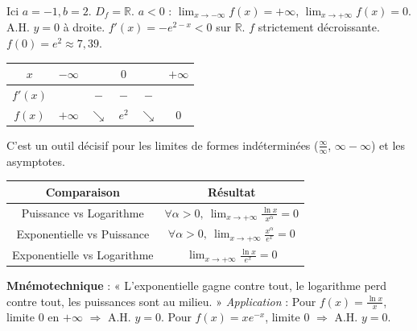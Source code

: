 \documentclass[11pt]{article}
\newcommand{\legende}[1]{\par\vspace{6pt}{\popsemi\fontsize{9}{11.5}\selectfont\color{popmuted}#1}}
\begin{document}
\begin{exemplebox}[Étude de $f(x) = e^{2-x} = e^{-x+2}$]
Ici $a=-1, b=2$.
$D_f = \mathbb{R}$.
$a<0$ : $\lim_{x\to -\infty} f(x) = +\infty$, $\lim_{x\to +\infty} f(x) = 0$. A.H. $y=0$ à droite.
$f'(x) = -e^{2-x} < 0$ sur $\mathbb{R}$. $f$ strictement décroissante.
$f(0) = e^2 \approx 7,39$.
\begin{center}
\begin{tabular}{|c|ccccc|}\hline
$x$ & $-\infty$ & & $0$ & & $+\infty$ \\ \hline
$f'(x)$ & & $-$ & $-$ & $-$ & \\ \hline
$f(x)$ & $+\infty$ & $\searrow$ & $e^2$ & $\searrow$ & $0$ \\ \hline
\end{tabular}
\end{center}
\tcblower
\begin{popfigure}
\legende{Courbe de $f(x)=e^{2-x}$.}
\end{popfigure}
\end{exemplebox}

\begin{savaistu}
C'est un outil décisif pour les limites de formes indéterminées ($\frac{\infty}{\infty}$, $\infty-\infty$) et les asymptotes.
\begin{center}
\begin{tabular}{|c|c|}\hline
\rowcolor{popblueL} \textbf{Comparaison} & \textbf{Résultat} \\ \hline
Puissance vs Logarithme & $\forall \alpha > 0,\ \lim_{x\to+\infty} \frac{\ln x}{x^\alpha} = 0$ \\ \hline
Exponentielle vs Puissance & $\forall \alpha > 0,\ \lim_{x\to+\infty} \frac{x^\alpha}{e^x} = 0$ \\ \hline
Exponentielle vs Logarithme & $\lim_{x\to+\infty} \frac{\ln x}{e^x} = 0$ \\ \hline
\end{tabular}
\end{center}
\textbf{Mnémotechnique} : « L'exponentielle gagne contre tout, le logarithme perd contre tout, les puissances sont au milieu. »
\emph{Application} : Pour $f(x) = \frac{\ln x}{x}$, limite $0$ en $+\infty$ $\Rightarrow$ A.H. $y=0$. Pour $f(x) = x e^{-x}$, limite $0$ $\Rightarrow$ A.H. $y=0$.
\end{savaistu}
\end{document}
